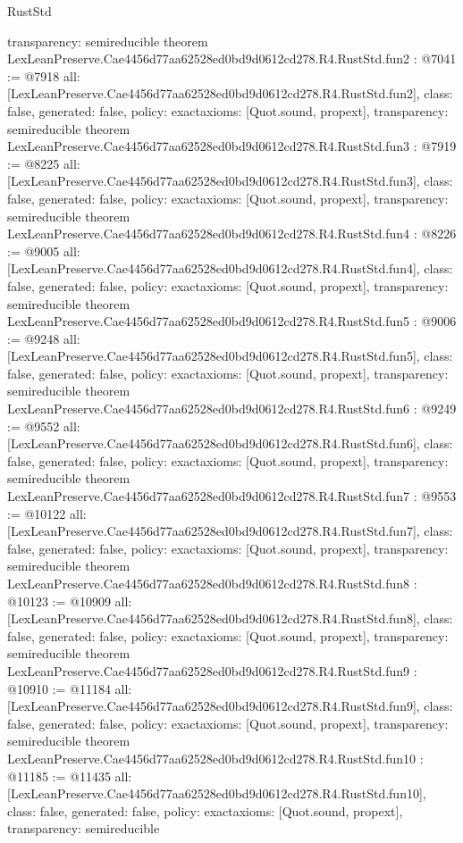 \begin{lexlean}{RustStd}
\begin{coremodule}
{  transparency: semireducible
}
theorem LexLeanPreserve.Cae4456d77aa62528ed0bd9d0612cd278.R4.RustStd.fun2 : @7041 := @7918 {
  all: [LexLeanPreserve.Cae4456d77aa62528ed0bd9d0612cd278.R4.RustStd.fun2],
  class: false,
  generated: false,
  policy: exact{axioms: [Quot.sound, propext]},
  transparency: semireducible
}
theorem LexLeanPreserve.Cae4456d77aa62528ed0bd9d0612cd278.R4.RustStd.fun3 : @7919 := @8225 {
  all: [LexLeanPreserve.Cae4456d77aa62528ed0bd9d0612cd278.R4.RustStd.fun3],
  class: false,
  generated: false,
  policy: exact{axioms: [Quot.sound, propext]},
  transparency: semireducible
}
theorem LexLeanPreserve.Cae4456d77aa62528ed0bd9d0612cd278.R4.RustStd.fun4 : @8226 := @9005 {
  all: [LexLeanPreserve.Cae4456d77aa62528ed0bd9d0612cd278.R4.RustStd.fun4],
  class: false,
  generated: false,
  policy: exact{axioms: [Quot.sound, propext]},
  transparency: semireducible
}
theorem LexLeanPreserve.Cae4456d77aa62528ed0bd9d0612cd278.R4.RustStd.fun5 : @9006 := @9248 {
  all: [LexLeanPreserve.Cae4456d77aa62528ed0bd9d0612cd278.R4.RustStd.fun5],
  class: false,
  generated: false,
  policy: exact{axioms: [Quot.sound, propext]},
  transparency: semireducible
}
theorem LexLeanPreserve.Cae4456d77aa62528ed0bd9d0612cd278.R4.RustStd.fun6 : @9249 := @9552 {
  all: [LexLeanPreserve.Cae4456d77aa62528ed0bd9d0612cd278.R4.RustStd.fun6],
  class: false,
  generated: false,
  policy: exact{axioms: [Quot.sound, propext]},
  transparency: semireducible
}
theorem LexLeanPreserve.Cae4456d77aa62528ed0bd9d0612cd278.R4.RustStd.fun7 : @9553 := @10122 {
  all: [LexLeanPreserve.Cae4456d77aa62528ed0bd9d0612cd278.R4.RustStd.fun7],
  class: false,
  generated: false,
  policy: exact{axioms: [Quot.sound, propext]},
  transparency: semireducible
}
theorem LexLeanPreserve.Cae4456d77aa62528ed0bd9d0612cd278.R4.RustStd.fun8 : @10123 := @10909 {
  all: [LexLeanPreserve.Cae4456d77aa62528ed0bd9d0612cd278.R4.RustStd.fun8],
  class: false,
  generated: false,
  policy: exact{axioms: [Quot.sound, propext]},
  transparency: semireducible
}
theorem LexLeanPreserve.Cae4456d77aa62528ed0bd9d0612cd278.R4.RustStd.fun9 : @10910 := @11184 {
  all: [LexLeanPreserve.Cae4456d77aa62528ed0bd9d0612cd278.R4.RustStd.fun9],
  class: false,
  generated: false,
  policy: exact{axioms: [Quot.sound, propext]},
  transparency: semireducible
}
theorem LexLeanPreserve.Cae4456d77aa62528ed0bd9d0612cd278.R4.RustStd.fun10 : @11185 := @11435 {
  all: [LexLeanPreserve.Cae4456d77aa62528ed0bd9d0612cd278.R4.RustStd.fun10],
  class: false,
  generated: false,
  policy: exact{axioms: [Quot.sound, propext]},
  transparency: semireducible
}
\end{coremodule}
\end{lexlean}
